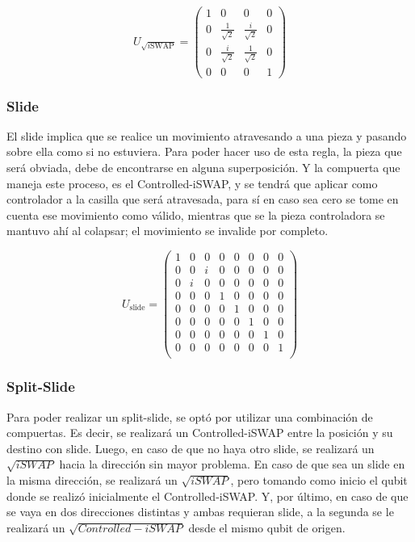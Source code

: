 \[
U_{\sqrt{i\text{SWAP}}} = \begin{pmatrix}
1 & 0 & 0 & 0 \\
0 & \frac{1}{\sqrt{2}} & \frac{i}{\sqrt{2}} & 0 \\
0 & \frac{i}{\sqrt{2}} & \frac{1}{\sqrt{2}} & 0 \\
0 & 0 & 0 & 1
\end{pmatrix}
\]

\subsubsection{Slide}

El slide implica que se realice un movimiento atravesando a una pieza y pasando sobre ella como si no estuviera. Para poder hacer uso de esta regla, la pieza que será obviada, debe de encontrarse en alguna superposición. Y la compuerta que maneja este proceso, es el Controlled-iSWAP, y se tendrá que aplicar como controlador a la casilla que será atravesada, para sí en caso sea cero se tome en cuenta ese movimiento como válido, mientras que se la pieza controladora se mantuvo ahí al colapsar; el movimiento se invalide por completo.

\[
U_{\text{slide}} = \begin{pmatrix}
1 & 0 & 0 & 0 & 0 & 0 & 0 & 0 \\
0 & 0 & i & 0 & 0 & 0 & 0 & 0 \\
0 & i & 0 & 0 & 0 & 0 & 0 & 0 \\
0 & 0 & 0 & 1 & 0 & 0 & 0 & 0 \\
0 & 0 & 0 & 0 & 1 & 0 & 0 & 0 \\
0 & 0 & 0 & 0 & 0 & 1 & 0 & 0 \\
0 & 0 & 0 & 0 & 0 & 0 & 1 & 0 \\
0 & 0 & 0 & 0 & 0 & 0 & 0 & 1 \\
\end{pmatrix}
\]

\subsubsection{Split-Slide}

Para poder realizar un split-slide, se optó por utilizar una combinación de compuertas. Es decir, se realizará un Controlled-iSWAP entre la posición y su destino con slide. Luego, en caso de que no haya otro slide, se realizará un $\sqrt{iSWAP}$ hacia la dirección sin mayor problema. En caso de que sea un slide en la misma dirección, se realizará un $\sqrt{iSWAP}$, pero tomando como inicio el qubit donde se realizó inicialmente el Controlled-iSWAP. Y, por último, en caso de que se vaya en dos direcciones distintas y ambas requieran slide, a la segunda se le realizará un $\sqrt{Controlled-iSWAP}$ desde el mismo qubit de origen.

